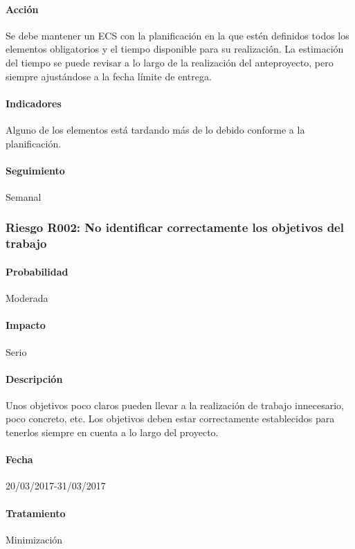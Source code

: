 \documentclass[10pt,a4paper]{article}
\begin{document}
				\paragraph{Acción} Se debe mantener un ECS con la planificación en la que estén definidos todos los elementos obligatorios y el tiempo disponible para su realización. La estimación del tiempo se puede revisar a lo largo de la realización del anteproyecto, pero siempre ajustándose a la fecha límite de entrega. %
				\paragraph{Indicadores} Alguno de los elementos está tardando más de lo debido conforme a la planificación. %
				\paragraph{Seguimiento}	Semanal %
	
            \subsubsection{Riesgo R002: No identificar correctamente los objetivos del trabajo}
				\paragraph{Probabilidad} Moderada
				\paragraph{Impacto}	Serio
				\paragraph{Descripción} Unos objetivos poco claros pueden llevar a la realización de trabajo innecesario, poco concreto, etc. Los objetivos deben estar correctamente establecidos para tenerlos siempre en cuenta a lo largo del proyecto.
				\paragraph{Fecha} 20/03/2017-31/03/2017 %
				\paragraph{Tratamiento} Minimización %
\end{document}
